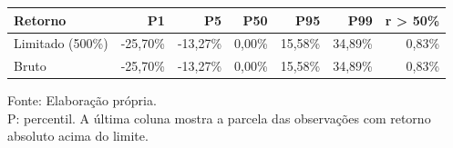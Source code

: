 \begingroup
\setlength{}
\setlength{}
\fontsize{12.0pt}{14.4pt}\selectfont

\setlength{\LTpost}{0mm}
\begin{longtable}{@{\extracolsep{\fill}}lrrrrrr}

\toprule
\textbf{Retorno} & \textbf{P1} & \textbf{P5} & \textbf{P50} & \textbf{P95} & \textbf{P99} & \textbf{\textbar{}r\textbar{} \textgreater{} 50\%} \\ 
\midrule\addlinespace[2.5pt]
Limitado (500\%) & -25,70\% & -13,27\% & 0,00\% & 15,58\% & 34,89\% & 0,83\% \\
Bruto & -25,70\% & -13,27\% & 0,00\% & 15,58\% & 34,89\% & 0,83\% \\
\bottomrule
\end{longtable}
\begin{minipage}{\linewidth}
Fonte: Elaboração própria.\\
P: percentil. A última coluna mostra a parcela das observações com retorno absoluto acima do limite.\\
\end{minipage}
\endgroup
